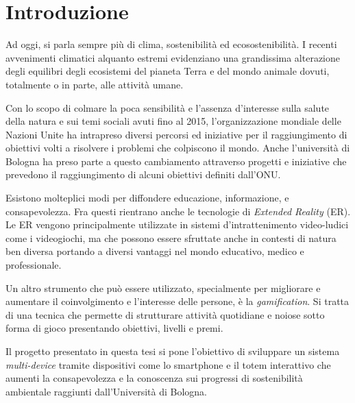 \chapter{Introduzione}

Ad oggi, si parla sempre più di clima, sostenibilità ed ecosostenibilità. I recenti avvenimenti climatici alquanto estremi evidenziano una grandissima alterazione degli equilibri degli ecosistemi del pianeta Terra e del mondo animale dovuti, totalmente o in parte, alle attività umane.
\vspace{10pt}

Con lo scopo di colmare la poca sensibilità e l'assenza d'interesse sulla salute della natura e sui temi sociali avuti fino al 2015, l'organizzazione mondiale delle Nazioni Unite ha intrapreso diversi percorsi ed iniziative per il raggiungimento di obiettivi volti a risolvere i problemi che colpiscono il mondo. Anche l'università di Bologna ha preso parte a questo cambiamento attraverso progetti e iniziative che prevedono il raggiungimento di alcuni obiettivi definiti dall'ONU.
\vspace{10pt}

Esistono molteplici modi per diffondere educazione, informazione, e consapevolezza. Fra questi rientrano anche le tecnologie di \textit{Extended Reality} (ER). Le ER vengono principalmente  utilizzate in sistemi d'intrattenimento video-ludici come i videogiochi, ma che possono essere sfruttate anche in contesti di natura ben diversa portando a diversi vantaggi nel mondo educativo, medico e professionale.
\vspace{10pt}

Un altro strumento che può essere utilizzato, specialmente per migliorare e aumentare il coinvolgimento e l'interesse delle persone, è la \textit{gamification}. Si tratta di una tecnica che permette di strutturare attività quotidiane e noiose sotto forma di gioco presentando obiettivi, livelli e premi.
\vspace{10pt}

Il progetto presentato in questa tesi si pone l'obiettivo di sviluppare un sistema \textit{multi-device} tramite dispositivi come lo smartphone e il totem interattivo che aumenti la consapevolezza e la conoscenza sui progressi di sostenibilità ambientale raggiunti dall'Università di Bologna.
\vspace{10pt}

